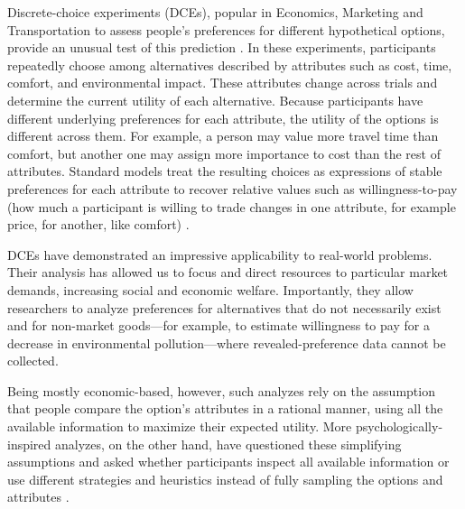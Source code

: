 \documentclass[man,natbib,floatsintext]{apa7}
\begin{document}
Discrete-choice experiments (DCEs), popular in Economics, Marketing and Transportation to assess people's preferences for different hypothetical options, provide an unusual test of this prediction \citep[see ][]{louviere2000stated,hensher2015applied}. In these experiments, participants repeatedly choose among alternatives described by attributes such as cost, time, comfort, and environmental impact. These attributes change across trials and determine the current utility of each alternative. Because participants have different underlying preferences for each attribute, the utility of the options is different across them. For example, a person may value more travel time than comfort, but another one may assign more importance to cost than the rest of attributes. Standard models treat the resulting choices as expressions of stable preferences for each attribute to recover relative values such as willingness-to-pay (how much a participant is willing to trade changes in one attribute, for example price, for another, like comfort) \citep{mcfadden1974,train2009}.  

DCEs have demonstrated an impressive applicability to real-world problems. Their analysis has allowed us to focus and direct resources to particular market demands, increasing social and economic welfare. Importantly, they allow researchers to analyze preferences for alternatives that do not necessarily exist and for non-market goods---for example, to estimate willingness to pay for a decrease in environmental pollution---where revealed-preference data cannot be collected. 

Being mostly economic-based, however, such analyzes rely on the assumption that people compare the option's attributes in a rational manner, using all the available information to maximize their expected utility. More psychologically-inspired analyzes, on the other hand, have questioned these simplifying assumptions and asked whether participants inspect all available information or use different strategies and heuristics instead of fully sampling the options and attributes \citep{hole2011,yegoryan2020,tversky1969}.

\end{document}
